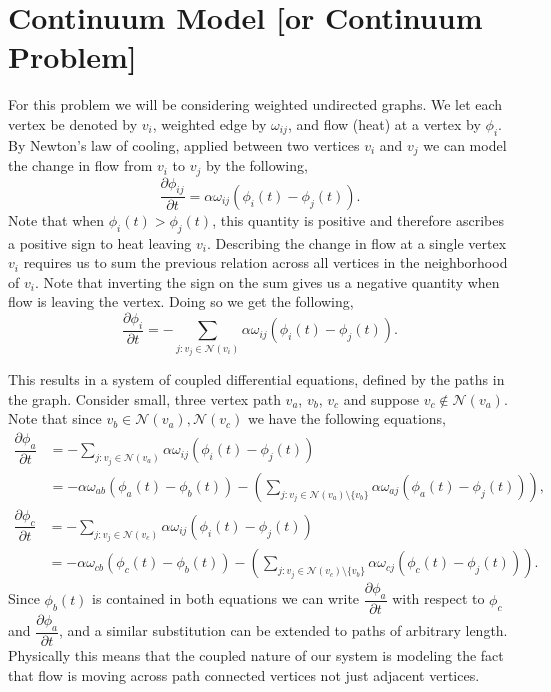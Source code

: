 \documentclass[11pt]{article}
\begin{document}
\section{Continuum Model [or Continuum Problem]} 
For this problem we will be considering weighted undirected graphs. 
We let each vertex be denoted by $v_i$, weighted edge by $\omega_{ij}$, and flow (heat) at a vertex by $\phi_i$. By Newton's law of cooling, applied 
between two vertices $v_i$ and $v_j$ we can model the change in flow from $v_i$ to $v_j$ by the following, 
\begin{equation*}
    \dfrac{\partial \phi_{ij}}{\partial t} = \alpha \omega_{ij}(\phi_i(t) - \phi_j(t)).
\end{equation*}
Note that when $\phi_i(t)>\phi_j(t)$, this quantity is positive and therefore ascribes a positive sign to heat leaving $v_i$. 
Describing the change in flow at a single vertex $v_i$ requires us to sum the previous relation across all vertices in the neighborhood of $v_i$. Note that 
inverting the sign on the sum gives us a negative quantity when flow is leaving the vertex. 
Doing so we get the following, 
\begin{equation*}
    \dfrac{\partial \phi_{i}}{\partial t} = -\sum_{j: v_j \in \mathcal{N}(v_i)} \alpha \omega_{ij}(\phi_i(t) - \phi_j(t)).
\end{equation*}





This results in a system of coupled differential equations, defined by the paths in the graph. Consider small, three vertex path $v_a$, $v_b$, $v_c$
and suppose $v_c \not\in \mathcal{N}(v_a)$. Note that since $v_b \in \mathcal{N}(v_a), \mathcal{N}(v_c)$ we have the following equations, 
\begin{align*}
    \dfrac{\partial \phi_{a}}{\partial t} &= -\sum_{j: v_j \in \mathcal{N}(v_a)} \alpha \omega_{ij}(\phi_i(t) - \phi_j(t))\\ 
    &= -\alpha\omega_{ab}(\phi_a(t) - \phi_b(t)) - \left(\sum_{j: v_j \in \mathcal{N}(v_a)\setminus\{v_b\}} \alpha \omega_{aj}(\phi_a(t) - \phi_j(t))\right),
\end{align*}  
\begin{align*}
    \dfrac{\partial \phi_{c}}{\partial t} &= -\sum_{j: v_j \in \mathcal{N}(v_c)} \alpha \omega_{ij}(\phi_i(t) - \phi_j(t))\\
    &= -\alpha\omega_{cb}(\phi_c(t) - \phi_b(t)) - \left(\sum_{j: v_j \in \mathcal{N}(v_c)\setminus\{v_b\}} \alpha \omega_{cj}(\phi_c(t) - \phi_j(t))\right).
\end{align*}  
Since $\phi_b(t)$ is contained in both equations we can write $\dfrac{\partial \phi_{a}}{\partial t}$ with respect to $\phi_c$ and  $\dfrac{\partial \phi_{a}}{\partial t}$, and a similar substitution can be extended to 
paths of arbitrary length. Physically this means that the coupled nature of our system is modeling the fact that flow is moving across path connected vertices not just adjacent vertices. 
\end{document}
